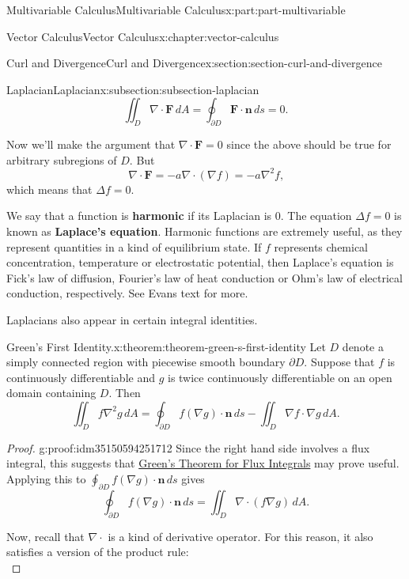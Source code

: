 \documentclass[twoside,10pt,]{book}
\newcommand{\terminology}[1]{\textbf{#1}}
\numberwithin{equation}{part}
\newcommand{\grad}{\nabla}
\renewcommand{\div}{\nabla\cdot}
\newcommand{\del}{\nabla}
\newcommand{\vb}[1]{\mathbf{#1}}
\newcommand{\dn}{\cdot\vb{n}\,ds}
\begin{document}
\begin{partptx}{Multivariable Calculus}{}{Multivariable Calculus}{}{}{x:part:part-multivariable}
\begin{chapterptx}{Vector Calculus}{}{Vector Calculus}{}{}{x:chapter:vector-calculus}
\begin{sectionptx}{Curl and Divergence}{}{Curl and Divergence}{}{}{x:section:section-curl-and-divergence}
\begin{subsectionptx}{Laplacian}{}{Laplacian}{}{}{x:subsection:subsection-laplacian}
\begin{equation*}
\iint_{D}\div\vb{F}\,dA = \oint_{\partial D}\vb{F}\cdot\vb{n}\,ds = 0\text{.}
\end{equation*}
%
\par
Now we'll make the argument that \(\div\vb{F} = 0\) since the above should be true for arbitrary subregions of \(D\). But%
\begin{equation*}
\div\vb{F} = -a\div(\grad f) = -a\del^{2}f\text{,}
\end{equation*}
which means that \(\Delta f = 0\).%
\par
We say that a function is \terminology{harmonic} if its Laplacian is \(0\). The equation \(\Delta f = 0\) is known as \terminology{Laplace's equation}. Harmonic functions are extremely useful, as they represent quantities in a kind of equilibrium state. If \(f\) represents chemical concentration, temperature or electrostatic potential, then Laplace's equation is Fick's law of diffusion, Fourier's law of heat conduction or Ohm's law of electrical conduction, respectively. See Evans text for more.%
\par
Laplacians also appear in certain integral identities.%
\begin{theorem}{Green's First Identity.}{}{x:theorem:theorem-green-s-first-identity}%
%
Let \(D\) denote a simply connected region with piecewise smooth boundary \(\partial D\). Suppose that \(f\) is continuously differentiable and \(g\) is twice continuously differentiable on an open domain containing \(D\). Then%
\begin{equation*}
\iint_{D}f\del^{2}g\,dA = \oint_{\partial D}f(\grad g)\dn - \iint_{D}\grad f\cdot \grad g\,dA\text{.}
\end{equation*}
%
\end{theorem}
\begin{proof}{}{g:proof:idm35150594251712}
Since the right hand side involves a flux integral, this suggests that \hyperref[x:theorem:theorem-green-s-theorem-for-flux-integrals]{Green's Theorem for Flux Integrals} may prove useful. Applying this to \(\oint_{\partial D}f(\grad g)\dn\) gives%
\begin{equation*}
\oint_{\partial D}f(\grad g)\dn = \iint_{D}\div(f\grad g)\,dA\text{.}
\end{equation*}
%
\par
Now, recall that \(\div\) is a kind of derivative operator. For this reason, it also satisfies a version of the product rule:%
\begin{equation*}

\end{equation*}
\end{proof}
\end{subsectionptx}
\end{sectionptx}
\end{chapterptx}
\end{partptx}
\end{document}
